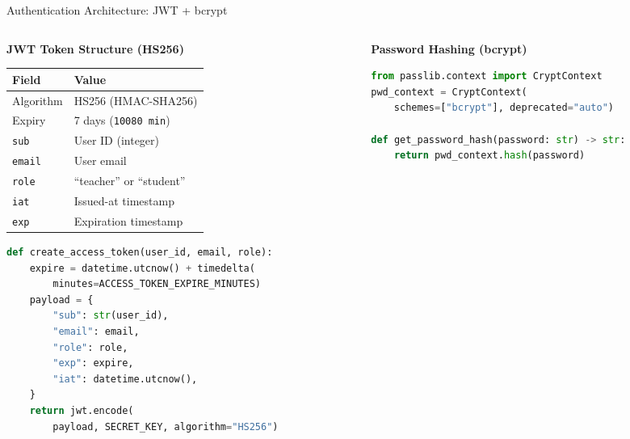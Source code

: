 \documentclass[aspectratio=169,10pt]{beamer}
\begin{document}
\begin{frame}{Authentication Architecture: JWT + bcrypt}
\begin{columns}[T]
\begin{column}{0.48\textwidth}
\textbf{JWT Token Structure (HS256)}

\vspace{4pt}
\footnotesize
\begin{tabular}{@{}ll@{}}
\toprule
\textbf{Field} & \textbf{Value} \\
\midrule
Algorithm & HS256 (HMAC-SHA256) \\
Expiry & 7 days (\texttt{10080 min}) \\
\texttt{sub} & User ID (integer) \\
\texttt{email} & User email \\
\texttt{role} & ``teacher'' or ``student'' \\
\texttt{iat} & Issued-at timestamp \\
\texttt{exp} & Expiration timestamp \\
\bottomrule
\end{tabular}

\vspace{6pt}
\begin{lstlisting}[language=Python, basicstyle=\ttfamily\tiny]
def create_access_token(user_id, email, role):
    expire = datetime.utcnow() + timedelta(
        minutes=ACCESS_TOKEN_EXPIRE_MINUTES)
    payload = {
        "sub": str(user_id),
        "email": email,
        "role": role,
        "exp": expire,
        "iat": datetime.utcnow(),
    }
    return jwt.encode(
        payload, SECRET_KEY, algorithm="HS256")
\end{lstlisting}
\end{column}

\begin{column}{0.48\textwidth}
\textbf{Password Hashing (bcrypt)}

\vspace{4pt}
\begin{lstlisting}[language=Python, basicstyle=\ttfamily\tiny]
from passlib.context import CryptContext
pwd_context = CryptContext(
    schemes=["bcrypt"], deprecated="auto")

def get_password_hash(password: str) -> str:
    return pwd_context.hash(password)


\end{lstlisting}
\end{column}
\end{columns}
\end{frame}
\end{document}
